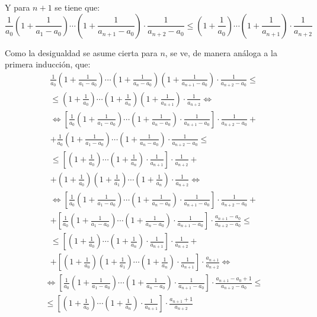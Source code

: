 \documentclass[../../main.tex]{subfiles}
\begin{document}
  Y para $n + 1$ se tiene que:
  $$
  \frac{1}{a_0} \left(1 + \frac{1}{a_1 - a_0}\right) \cdots \left(1 + \frac{1}{a_{n + 1} - a_0}\right) \cdot \frac{1}{a_{n + 2} - a_0} \leq \left(1 + \frac{1}{a_0}\right) \cdots \left(1 + \frac{1}{a_{n + 1}}\right) \cdot \frac{1}{a_{n + 2}}
  $$

  Como la desigualdad se asume cierta para $n$, se ve, de manera análoga a la primera inducción, que:
  \begin{multline*}
    \frac{1}{a_0} \left(1 + \frac{1}{a_1 - a_0}\right) \cdots \left(1 + \frac{1}{a_n - a_0}\right) \left(1 + \frac{1}{a_{n + 1} - a_0}\right) \cdot \frac{1}{a_{n + 2} - a_0} \leq \\ \leq \left(1 + \frac{1}{a_0}\right) \cdots \left(1 + \frac{1}{a_n}\right) \left(1 + \frac{1}{a_{n + 1}}\right) \cdot \frac{1}{a_{n + 2}} \iff
  \end{multline*}
  \begin{multline*}
    \iff \left[ \frac{1}{a_0} \left(1 + \frac{1}{a_1 - a_0}\right) \cdots \left(1 + \frac{1}{a_n - a_0}\right) \cdot \frac{1}{a_{n + 1} - a_0} \right] \cdot \frac{1}{a_{n + 2} - a_0} + \\ + \frac{1}{a_0} \left(1 + \frac{1}{a_1 - a_0}\right) \cdots \left(1 + \frac{1}{a_n - a_0}\right) \cdot \frac{1}{a_{n + 2} - a_0} \leq \\ \leq \left[ \left(1 + \frac{1}{a_0}\right) \cdots \left(1 + \frac{1}{a_n}\right) \cdot \frac{1}{a_{n + 1}} \right] \cdot \frac{1}{a_{n + 2}} + \\ + \left(1 + \frac{1}{a_0}\right) \left(1 + \frac{1}{a_1}\right) \cdots \left(1 + \frac{1}{a_n}\right) \cdot \frac{1}{a_{n + 2}}\iff
  \end{multline*}
  \begin{multline*}
    \iff \left[ \frac{1}{a_0} \left(1 + \frac{1}{a_1 - a_0}\right) \cdots \left(1 + \frac{1}{a_n - a_0} \right) \cdot \frac{1}{a_{n + 1} - a_0} \right] \cdot \frac{1}{a_{n + 2} - a_0} + \\ + \left[ \frac{1}{a_0} \left(1 + \frac{1}{a_1 - a_0}\right) \cdots \left(1 + \frac{1}{a_n - a_0}\right) \cdot \frac{1}{a_{n + 1} - a_0} \right] \cdot \frac{a_{n + 1} - a_0}{a_{n + 2} - a_0} \leq \\ \leq \left[ \left(1 + \frac{1}{a_0}\right) \cdots \left(1 + \frac{1}{a_n}\right) \cdot \frac{1}{a_{n + 1}} \right] \cdot \frac{1}{a_{n + 2}} + \\ + \left[ \left(1 + \frac{1}{a_0}\right) \left(1 + \frac{1}{a_1}\right) \cdots \left(1 + \frac{1}{a_n}\right) \cdot \frac{1}{a_{n + 1}} \right] \cdot \frac{a_{n + 1}}{a_{n + 2}}\iff
  \end{multline*}
  \begin{multline*}
    \iff \left[ \frac{1}{a_0} \left(1 + \frac{1}{a_1 - a_0}\right) \cdots \left(1 + \frac{1}{a_n - a_0} \right) \cdot \frac{1}{a_{n + 1} - a_0} \right] \cdot \frac{a_{n + 1} - a_0 + 1}{a_{n + 2} - a_0} \leq \\ \leq \left[ \left(1 + \frac{1}{a_0}\right) \cdots \left(1 + \frac{1}{a_n}\right) \cdot \frac{1}{a_{n + 1}} \right] \cdot \frac{a_{n + 1} + 1}{a_{n + 2}}
  \end{multline*}
\end{document}
